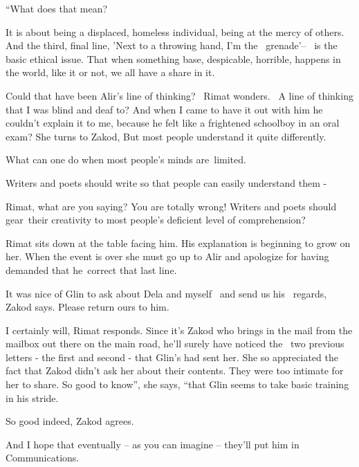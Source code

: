 \documentclass[letterpaper]{article}
\begin{document}
{}``What does that mean?{\textquotedbl} 

{\textquotedbl}It is about being a displaced, homeless individual, being at the mercy of others. And the third, final
line, 'Next to a throwing hand, I'm the~ grenade'--~ is the basic ethical issue. That when something base, despicable,
horrible, happens in the world, like it or not, we all have a share in
it.{\textquotedbl}\textcolor[rgb]{0.0,0.6901961,0.9411765}{ }

Could that have been Alir's line of thinking? \ Rimat wonders. \ A line of thinking that I was blind and deaf to? And
when I came to have it out with him he couldn't explain it to me, because he felt like a frightened schoolboy in an
oral exam? She turns to\textcolor[rgb]{0.0,0.6901961,0.9411765}{ }Zakod, {\textquotedbl}But most people understand it
quite differently.{\textquotedbl} 

{\textquotedbl}What can one do when most people's minds are~limited.{\textquotedbl} 

{\textquotedbl}Writers and poets should write so that people can easily understand them -{\textquotedbl} 

{\textquotedbl}Rimat, what are you saying? You are totally wrong! Writers and poets should gear~their creativity to most
people's deficient level of comprehension?{\textquotedbl} 

Rimat sits down at the table facing him. His explanation is beginning to grow on her. When the event is over she must go
up to Alir and apologize for having demanded that he~correct\textcolor{red}{ }that last line.

{\textquotedbl}It was nice of Glin to ask about Dela and\textcolor{red}{ }myself \ and send us his~
regards,{\textquotedbl} Zakod says. {\textquotedbl}Please return ours to him.{\textquotedbl} 

{\textquotedbl}I certainly will,{\textquotedbl} Rimat responds. Since it's Zakod who brings in the mail from the mailbox
out there on the main road, he'll surely have noticed the \ two previous letters - the first and second - that Glin's
had sent her. She so appreciated the fact that Zakod didn't ask her about their contents. They were too intimate for
her to share. {\textquotedbl}So good to know'', she says, ``that Glin seems to take basic training in his
stride.{\textquotedbl} 

{\textquotedbl}So good indeed,{\textquotedbl} Zakod agrees. 

{\textquotedbl}And I hope that eventually -- as you can imagine -- they'll put him in Communications.{\textquotedbl} 
\end{document}
